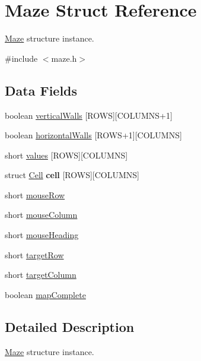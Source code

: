 \hypertarget{struct_maze}{}\section{Maze Struct Reference}
\label{struct_maze}


\hyperlink{struct_maze}{Maze} structure instance.  




{\ttfamily \#include $<$maze.\+h$>$}

\subsection*{Data Fields}
\begin{DoxyCompactItemize}
\item 
boolean \hyperlink{struct_maze_a0b1e65db462f021fc50daaea40d51037}{vertical\+Walls} \mbox{[}R\+O\+W\+S\mbox{]}\mbox{[}C\+O\+L\+U\+M\+N\+S+1\mbox{]}
\item 
boolean \hyperlink{struct_maze_a5e6e52f4614a45d6f0ab0f43af9b8291}{horizontal\+Walls} \mbox{[}R\+O\+W\+S+1\mbox{]}\mbox{[}C\+O\+L\+U\+M\+N\+S\mbox{]}
\item 
short \hyperlink{struct_maze_a9755fe6553e3536eb0e84a8c21a3957e}{values} \mbox{[}R\+O\+W\+S\mbox{]}\mbox{[}C\+O\+L\+U\+M\+N\+S\mbox{]}
\item 
\hypertarget{struct_maze_aafa7c598fd27aff11ab2cbd777771934}{}struct \hyperlink{struct_cell}{Cell} {\bfseries cell} \mbox{[}R\+O\+W\+S\mbox{]}\mbox{[}C\+O\+L\+U\+M\+N\+S\mbox{]}\label{struct_maze_aafa7c598fd27aff11ab2cbd777771934}

\item 
short \hyperlink{struct_maze_a25fbdad541be1fc5c7d6f24cd5affb32}{mouse\+Row}
\item 
short \hyperlink{struct_maze_aff431e9c6fe8a138320e2b32f8160ae7}{mouse\+Column}
\item 
short \hyperlink{struct_maze_a06eb34bb9132c0dc618cbea56484e4f9}{mouse\+Heading}
\item 
short \hyperlink{struct_maze_a1458fbf99b584cba92836ab88ee6f8a5}{target\+Row}
\item 
short \hyperlink{struct_maze_a9766593afcd1e7190fa595580d22c361}{target\+Column}
\item 
boolean \hyperlink{struct_maze_ac252030149db173cf7a0e623f7d1552a}{map\+Complete}
\end{DoxyCompactItemize}


\subsection{Detailed Description}
\hyperlink{struct_maze}{Maze} structure instance. 


